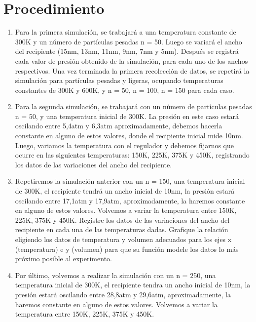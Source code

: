 \documentclass[]{article}
\begin{document}
\section{Procedimiento}
\begin{enumerate}
    \item Para la primera simulación, se trabajará a una temperatura constante de 300K y un número de partículas pesadas n = 50. Luego se  variará el ancho del recipiente (15nm, 13nm, 11nm,
    9nm, 7nm y 5nm). Después se registrá cada valor de presión obtenido de la simulación, para cada
    uno de los anchos respectivos.
    Una vez terminada la primera recolección de datos, se repetirá la simulación para partículas pesadas y ligeras, ocupando temperaturas constantes de 300K y 600K, y n = 50, n = 100, n = 150
    para cada caso. 

    \item Para la segunda simulación, se trabajará con un número de partículas pesadas n = 50, y una
    temperatura inicial de 300K. La presión en este caso estará oscilando entre 5,4atm y 6,3atm
    aproximadamente, debemos hacerla constante en alguno de estos valores, donde el recipiente inicial mide 10nm. Luego, 
    variamos la temperatura con el regulador y debemos fijarnos que ocurre en las siguientes temperaturas: 
    150K, 225K, 375K y 450K, registrando los datos de las variaciones del ancho del recipiente.
    

    \item Repetiremos la simulación anterior con un  n = 150, una temperatura inicial de 300K, el recipiente
    tendrá un ancho inicial de 10nm, la presión estará oscilando entre 17,1atm y 17,9atm, aproximadamente, la haremos constante
    en alguno de estos valores. Volvemos a variar la temperatura entre 150K, 225K, 375K y 450K. Registre los datos de las variaciones 
    del ancho del recipiente en cada una de las temperaturas dadas.
    Grafique la relación eligiendo los datos de temperatura y volumen adecuados para los ejes x (temperatura) e y (volumen) para que 
    su función modele los datos lo más próximo posible al experimento.

    \item  Por último, volvemos a realizar la simulación con un n = 250, una temperatura inicial de 300K, el
    recipiente tendra un ancho inicial de 10nm, la presión estará oscilando entre 28,8atm y 29,6atm,
    aproximadamente, la haremos constante en alguno de estos valores. Volvemos a variar la temperatura entre 
    150K, 225K, 375K y 450K.
    
    
\end{enumerate}
\end{document}
